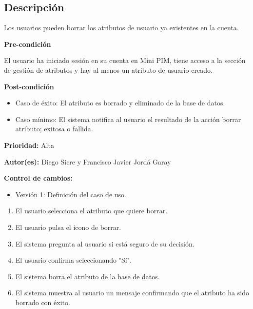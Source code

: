 

\subsection*{Descripción}
Los usuarios pueden borrar los atributos de usuario ya existentes en la cuenta.
\vspace{0.15cm}

\textbf{Pre-condición}\par
El usuario ha iniciado sesión en su cuenta en Mini PIM, tiene acceso a la sección de gestión de atributos y hay al menos un atributo de usuario creado.\par
\vspace{0.15cm}

\textbf{Post-condición}
\begin{itemize}
    \item Caso de éxito: El atributo es borrado y eliminado de la base de datos.
    \item Caso mínimo: El sistema notifica al usuario el resultado de la acción borrar atributo; exitosa o fallida.
\end{itemize}

\textbf{Prioridad: }
Alta
\vspace{0.15cm}

\textbf{Autor(es): }
Diego Sicre y Francisco Javier Jordá Garay\par
\vspace{0.15cm}

\textbf{Control de cambios: }
\begin{itemize}
    \item Versión 1: Definición del caso de uso.
\end{itemize}


\begin{enumerate}
    \item El usuario selecciona el atributo que quiere borrar.
    \item El usuario pulsa el icono de borrar.
    \item El sistema pregunta al usuario si está seguro de su decisión.
    \item El usuario confirma seleccionando "Sí".
    \item El sistema borra el atributo de la base de datos.
    \item El sistema muestra al usuario un mensaje confirmando que el atributo ha sido borrado con éxito.
\end{enumerate}

